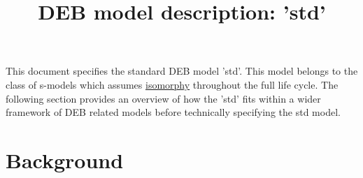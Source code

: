 \documentclass{article}
\title{DEB model description: 'std'}
\begin{document}
\maketitle

This document specifies the standard DEB model 'std'.
This model belongs to the class of s-models which assumes \href{https://en.wikipedia.org/wiki/Isomorphism}{isomorphy} throughout the full life cycle.
The following section provides an overview of how the 'std' fits within a wider framework of DEB related models before technically specifying the std model.

\section{Background}







\end{document}
